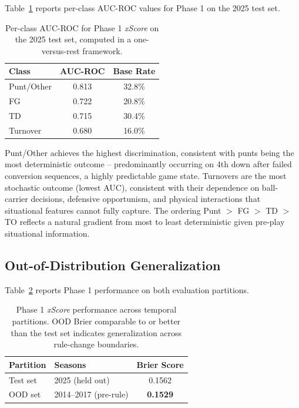 \documentclass[12pt,a4paper]{article}
\newcommand{\xscore}{\textit{xScore}}
\begin{document}
Table~\ref{tab:auc} reports per-class AUC-ROC values for Phase 1 on the 2025 test set.

\begin{table}[htbp]
  \centering
  \caption{Per-class AUC-ROC for Phase 1 \xscore{} on the 2025 test set, computed in a one-versus-rest framework.}
  \label{tab:auc}
  \begin{tabular}{lcc}
    \toprule
    \textbf{Class} & \textbf{AUC-ROC} & \textbf{Base Rate} \\
    \midrule
    Punt/Other & 0.813 & 32.8\% \\
    FG & 0.722 & 20.8\% \\
    TD & 0.715 & 30.4\% \\
    Turnover & 0.680 & 16.0\% \\
    \bottomrule
  \end{tabular}
\end{table}

Punt/Other achieves the highest discrimination, consistent with punts being the most deterministic outcome -- predominantly occurring on 4th down after failed conversion sequences, a highly predictable game state. Turnovers are the most stochastic outcome (lowest AUC), consistent with their dependence on ball-carrier decisions, defensive opportunism, and physical interactions that situational features cannot fully capture. The ordering Punt $>$ FG $>$ TD $>$ TO reflects a natural gradient from most to least deterministic given pre-play situational information.

\subsection{Out-of-Distribution Generalization}

Table~\ref{tab:ood} reports Phase 1 performance on both evaluation partitions.

\begin{table}[htbp]
  \centering
  \caption{Phase 1 \xscore{} performance across temporal partitions. OOD Brier comparable to or better than the test set indicates generalization across rule-change boundaries.}
  \label{tab:ood}
  \begin{tabularx}{\textwidth}{lXc}
    \toprule
    \textbf{Partition} & \textbf{Seasons} & \textbf{Brier Score} \\
    \midrule
    Test set & 2025 (held out) & 0.1562 \\
    OOD set & 2014--2017 (pre-rule) & \textbf{0.1529} \\
    \bottomrule
  \end{tabularx}
\end{table}
\end{document}
